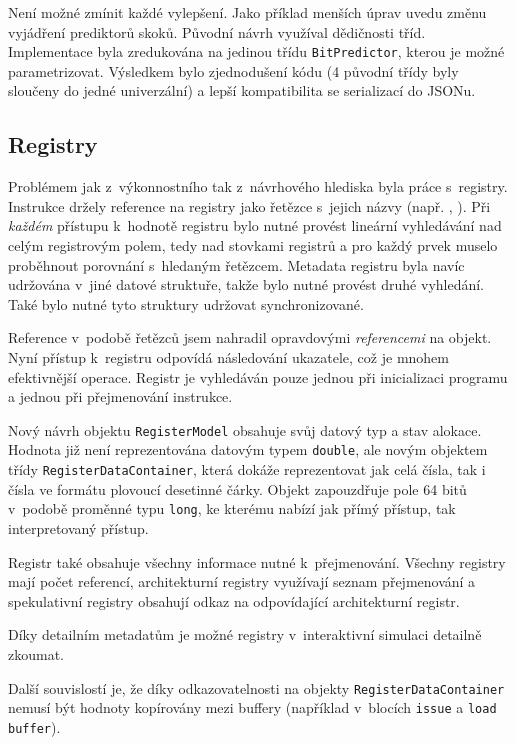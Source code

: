 Není možné zmínit každé vylepšení.
Jako příklad menších úprav uvedu změnu vyjádření prediktorů skoků.
Původní návrh využíval dědičnosti tříd.
Implementace byla zredukována na jedinou třídu \texttt{BitPredictor}, kterou je možné parametrizovat.
Výsledkem bylo zjednodušení kódu (4 původní třídy byly sloučeny do jedné univerzální) a lepší kompatibilita se serializací do JSONu.

\subsection{Registry}

Problémem jak z~výkonnostního tak z~návrhového hlediska byla práce s~registry.
Instrukce držely reference na registry jako řetězce s~jejich názvy (např. \texttt{}, \texttt{}).
Při \emph{každém} přístupu k~hodnotě registru bylo nutné provést lineární vyhledávání nad celým registrovým polem, tedy nad stovkami registrů a pro každý prvek muselo proběhnout porovnání s~hledaným řetězcem.
Metadata registru byla navíc udržována v~jiné datové struktuře, takže bylo nutné provést druhé vyhledání.
Také bylo nutné tyto struktury udržovat synchronizované.

Reference v~podobě řetězců jsem nahradil opravdovými \emph{referencemi} na objekt.
Nyní přístup k~registru odpovídá následování ukazatele, což je mnohem efektivnější operace.
Registr je vyhledáván pouze jednou při inicializaci programu a jednou při přejmenování instrukce.

Nový návrh objektu \texttt{RegisterModel} obsahuje svůj datový typ a stav alokace.
Hodnota již není reprezentována datovým typem \texttt{double}, ale novým objektem třídy \texttt{Register\-Data\-Container}, která dokáže reprezentovat jak celá čísla, tak i čísla ve formátu plovoucí desetinné čárky.
Objekt zapouzdřuje pole 64 bitů v~podobě proměnné typu \texttt{long}, ke kterému nabízí jak přímý přístup, tak interpretovaný přístup.

Registr také obsahuje všechny informace nutné k~přejmenování.
Všechny registry mají počet referencí, architekturní registry využívají seznam přejmenování a spekulativní registry obsahují odkaz na odpovídající architekturní registr.

Díky detailním metadatům je možné registry v~interaktivní simulaci detailně zkoumat.

Další souvislostí je, že díky odkazovatelnosti na objekty \texttt{RegisterDataContainer} nemusí být hodnoty kopírovány mezi buffery (například v~blocích \texttt{issue} a \texttt{load buffer}). 

